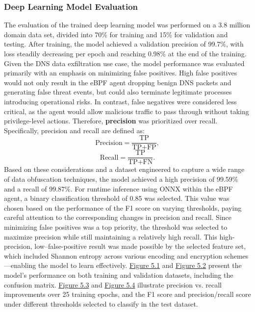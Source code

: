 \documentclass [11pt, proquest] {uwthesis}[2020/02/24]
\begin{document}
\subsubsection{Deep Learning Model Evaluation}
The evaluation of the trained deep learning model was performed on a 3.8 million domain data set, divided into 70\% for training and 15\% for validation and testing. After training, the model achieved a validation precision of 99.7\%, with loss steadily decreasing per epoch and reaching 0.98\% at the end of the training. Given the DNS data exfiltration use case, the model performance was evaluated primarily with an emphasis on minimizing false positives. High false positives would not only result in the eBPF agent dropping benign DNS packets and generating false threat events, but could also terminate legitimate processes introducing operational risks. In contrast, false negatives were considered less critical, as the agent would allow malicious traffic to pass through without taking privilege-level actions. Therefore, \textbf{precision} was prioritized over recall. Specifically, precision and recall are defined as:
\[
\text{Precision} = \frac{\text{TP}}{\text{TP} + \text{FP}},
\]
\[
\text{Recall} = \frac{\text{TP}}{\text{TP} + \text{FN}}.
\]
Based on these considerations and a dataset engineered to capture a wide range of data obfuscation techniques, the model achieved a high precision of 99.59\% and a recall of 99.87\%. For runtime inference using ONNX within the eBPF agent, a binary classification threshold of 0.85 was selected. This value was chosen based on the performance of the F1 score on varying thresholds, paying careful attention to the corresponding changes in precision and recall. Since minimizing false positives was a top priority, the threshold was selected to maximize precision while still maintaining a relatively high recall. This high-precision, low–false-positive result was made possible by the selected feature set, which included Shannon entropy across various encoding and encryption schemes—enabling the model to learn effectively. \hyperref[tab:model-evaluation-metrics]{Figure 5.1} and \hyperref[fig:threshold-vs-metrics]{Figure 5.2} present the model’s performance on both training and validation datasets, including the confusion matrix. \hyperref[fig:model_precision]{Figure 5.3} and \hyperref[fig:model_f1_threshold]{Figure 5.4} illustrate precision vs. recall improvements over 25 training epochs, and the F1 score and precision/recall score under different thresholds selected to classify in the test dataset.
\end{document}

